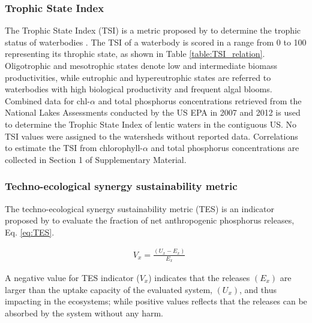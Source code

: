 \begin{refsection}[referencesCh4]
\subsubsection{Trophic State Index}
The Trophic State Index (TSI) is a metric proposed by \citet{carlson_trophic_1977} to determine the trophic status of waterbodies \citep{QAPP2012}. The TSI of a waterbody is scored in a range from 0 to 100 representing its throphic state, as shown in Table \ref{table:TSI_relation}. Oligotrophic and mesotrophic states denote low and intermediate biomass productivities, while eutrophic and hypereutrophic states are referred to waterbodies with high biological productivity and frequent algal blooms. Combined data for chl-$\alpha$ and total phosphorus concentrations retrieved from the National Lakes Assessments conducted by the US EPA in 2007 and 2012 \citep{NLA2012, NLA2007} is used to determine the Trophic State Index of lentic waters in the contiguous US. No TSI values were assigned to the watersheds without reported data. Correlations to estimate the TSI from chlorophyll-$\alpha$ and total phosphorus concentrations are collected in Section 1 of Supplementary Material.

\begin{table}[h]
	\centering
	\caption{Relation between TSI value and trophic class.}
	\label{table:TSI_relation}
\end{table}

\subsubsection{Techno-ecological synergy sustainability metric}
The techno-ecological synergy sustainability metric (TES) is an indicator proposed by \citet{TESmetric} to evaluate the fraction of net anthropogenic phosphorus releases, Eq. \ref{eq:TES}. 

\begin{align}
& V_{x} =\frac{\left(U_{x} - E_{x}\right)}{E_{x}} \label{eq:TES}
\end{align}

A negative value for TES indicator ($V_{x}$) indicates that the releases $\left(E_{x}\right)$ are larger than the uptake capacity of the evaluated system, $\left(U_{x}\right)$, and thus impacting in the ecosystems; while positive values reflects that the releases can be absorbed by the system without any harm. 


\end{refsection}
